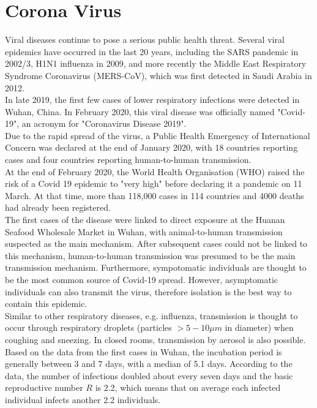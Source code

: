%
\chapter{Corona Virus}
\label{sec:corona}
Viral diseases continue to pose a serious public health threat. Several viral epidemics have occurred in the last 20 years, including the SARS pandemic in 2002/3, H1N1 influenza in 2009, and more recently the Middle East Respiratory Syndrome Coronavirus (MERS-CoV), which was first detected in Saudi Arabia in 2012. \\
In late 2019, the first few cases of lower respiratory infections were detected in Wuhan, China. In February 2020, this viral disease was officially named "Covid-19", an acronym for "Coronavirus Disease 2019". \\
Due to the rapid spread of the virus, a Public Health Emergency of International Concern was declared at the end of January 2020, with 18 countries reporting cases and four countries reporting human-to-human transmission. \\
At the end of February 2020, the World Health Organisation (WHO) raised the risk of a Covid 19 epidemic to "very high" before declaring it a pandemic on 11 March. At that time, more than 118,000 cases in 114 countries and 4000 deaths had already been registered. \\
The first cases of the disease were linked to direct exposure at the Huanan Seafood Wholesale Market in Wuhan, with animal-to-human transmission suspected as the main mechanism. After subsequent cases could not be linked to this mechanism, human-to-human transmission was presumed to be the main transmission mechanism. Furthermore, sympotomatic individuals are thought to be the most common source of Covid-19 spread. However, asymptomatic individuals can also transmit the virus, therefore isolation is the best way to contain this epidemic. \\
Similar to other respiratory diseases, e.g. influenza, transmission is thought to occur through respiratory droplets (particles $>5-10\mu m$ in diameter) when coughing and sneezing. In closed rooms, transmission by aerosol is also possible. \\
Based on the data from the first cases in Wuhan, the incubation period is generally between 3 and 7 days, with a median of 5.1 days. According to the data, the number of infections doubled about every seven days and the basic reproductive number $R$ is 2.2, which means that on average each infected individual infects another 2.2 individuals. \\

